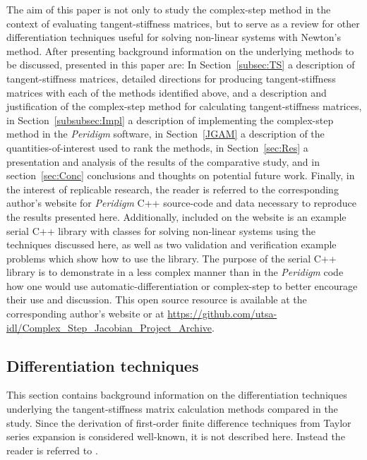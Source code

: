 \documentclass[preprint,12pt]{elsarticle}
\begin{document}
The aim of this paper is not only to  study the complex-step method in the context of evaluating tangent-stiffness matrices, but to serve as a review for other differentiation techniques useful for solving non-linear systems with Newton's method. After presenting background information on the underlying methods to be discussed, presented in this paper are: In Section~\ref{subsec:TS} a description of tangent-stiffness matrices, detailed directions for producing tangent-stiffness matrices with each of the methods identified above, and a description and justification of the   complex-step method for calculating tangent-stiffness matrices, in Section~\ref{subsubsec:Impl} a description of implementing the complex-step method in the \emph{Peridigm} software, in Section~\ref{JGAM} a description of the quantities-of-interest used to rank the methods, in Section~\ref{sec:Res} a presentation and analysis of the results of the comparative study, and in section~\ref{sec:Conc} conclusions and thoughts on potential future work.  Finally, in the interest of replicable research, the reader is referred to the corresponding author's website for \emph{Peridigm} C++ source-code and data necessary to reproduce the results presented here. Additionally, included on the website is an example serial C++ library with classes for solving non-linear systems using the techniques discussed here, as well as two validation and verification example problems which show how to use the library.  The purpose of the serial C++ library is to demonstrate in a less complex manner than in the \emph{Peridigm} code how one would use automatic-differentiation or complex-step to better encourage their use and discussion.  This open source resource is available at the corresponding author's website or at \href{https://github.com/utsa-idl/Complex_Step_Jacobian_Project_Archive}{https://github.com/utsa-idl/Complex\_Step\_Jacobian\_Project\_Archive}.

\subsection{Differentiation techniques}

This section contains background information on the differentiation techniques underlying the tangent-stiffness matrix calculation methods compared in the study. Since the derivation of first-order finite difference techniques from Taylor series expansion is considered well-known, it is not described here.  Instead the reader is referred to \cite[Chap. 4.1.3]{chapra2010}.
\end{document}
